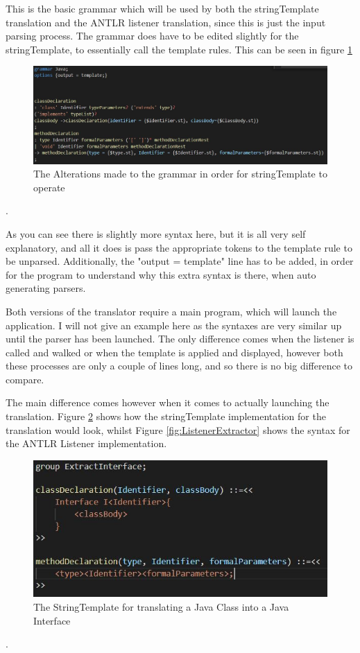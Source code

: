 \documentclass{l4proj}
\begin{document}
This is the basic grammar which will be used by both the stringTemplate translation and the ANTLR listener translation, since this is just the input parsing process. The grammar does have to be edited slightly for the stringTemplate, to essentially call the template rules. This can be seen in figure \ref{fig:STAlteration}

\begin{figure}[htb]
    \centering
    \includegraphics[width=1\linewidth]{images/STAlteration.JPG}
        \caption{The Alterations made to the grammar in order for stringTemplate to operate
    }
    \label{fig:STAlteration} 
\end{figure}.

As you can see there is slightly more syntax here, but it is all very self explanatory, and all it does is pass the appropriate tokens to the template rule to be unparsed. Additionally, the "output = template" line has to be added, in order for the program to understand why this extra syntax is there, when auto generating parsers.

Both versions of the translator require a main program, which will launch the application. I will not give an example here as the syntaxes are very similar up until the parser has been launched. The only difference comes when the listener is called and walked or when the template is applied and displayed, however both these processes are only a couple of lines long, and so there is no big difference to compare.

The main difference comes however when it comes to actually launching the translation. Figure \ref{fig:STExtractor} shows how the stringTemplate implementation for the translation would look, whilst Figure \ref{fig:ListenerExtractor} shows the syntax for the ANTLR Listener implementation.

\begin{figure}[htb]
    \centering
    \includegraphics[width=1\linewidth]{images/STExtractor.JPG}
        \caption{The StringTemplate for translating a Java Class into a Java Interface
    }
    \label{fig:STExtractor} 
\end{figure}.
\end{document}
